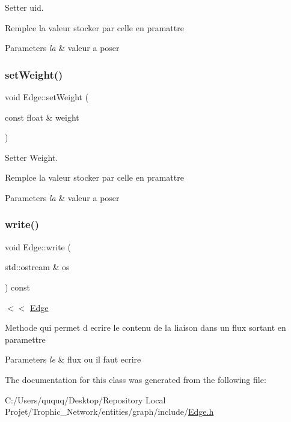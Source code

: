 Setter uid. 

Remplce la valeur stocker par celle en pramattre


\begin{DoxyParams}{Parameters}
{\em la} & valeur a poser \\
\hline
\end{DoxyParams}
\mbox{\label{class_edge_af784390543c16f8ce3b5297f3adfcc10}} 
\subsubsection{\texorpdfstring{set\+Weight()}{setWeight()}}
{\footnotesize\ttfamily void Edge\+::set\+Weight (\begin{DoxyParamCaption}\item[{const float \&}]{weight }\end{DoxyParamCaption})}



Setter Weight. 

Remplce la valeur stocker par celle en pramattre


\begin{DoxyParams}{Parameters}
{\em la} & valeur a poser \\
\hline
\end{DoxyParams}
\mbox{\label{class_edge_a51f56adcdff2231bf0d351c732278f74}} 
\subsubsection{\texorpdfstring{write()}{write()}}
{\footnotesize\ttfamily void Edge\+::write (\begin{DoxyParamCaption}\item[{std\+::ostream \&}]{os }\end{DoxyParamCaption}) const}



$<$$<$ \mbox{\hyperlink{class_edge}{Edge}} 

Methode qui permet d ecrire le contenu de la liaison dans un flux sortant en paramettre


\begin{DoxyParams}{Parameters}
{\em le} & flux ou il faut ecrire \\
\hline
\end{DoxyParams}


The documentation for this class was generated from the following file\+:\begin{DoxyCompactItemize}
\item 
C\+:/\+Users/ququq/\+Desktop/\+Repository Local Projet/\+Trophic\+\_\+\+Network/entities/graph/include/\mbox{\hyperlink{_edge_8h}{Edge.\+h}}\end{DoxyCompactItemize}
